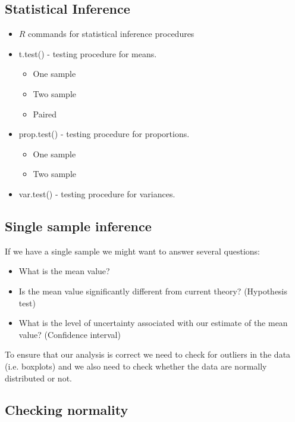 \subsection{Statistical Inference}
\begin{itemize}
\item $R$ commands for statistical inference procedures \item
t.test() - testing procedure for means.
\begin{itemize}
\item One sample \item Two sample \item Paired
\end{itemize}
\item prop.test() - testing procedure for proportions.
\begin{itemize}
\item One sample \item Two sample
\end{itemize}
\item var.test() - testing procedure for variances.
\end{itemize}
%




\subsection{Single sample inference}

If we have a single sample we might want to answer several
questions:
\begin{itemize}
\item What is the mean value? \item Is the mean value
significantly different from current theory? (Hypothesis test)
\item What is the level of uncertainty associated with our
estimate of the mean value? (Confidence interval)
\end{itemize}
To ensure that our analysis is correct we need to check for
outliers in the data (i.e. boxplots) and we also need to check
whether the data are normally distributed or not.
%

\subsection{Checking normality}


